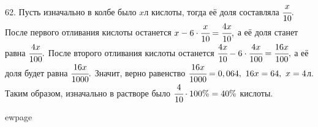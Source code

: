 62. Пусть изначально в колбе было $x$л кислоты, тогда её доля составляла $\cfrac{x}{10}.$ После первого отливания кислоты останется $x-6\cdot\cfrac{x}{10}=\cfrac{4x}{10},$ а её доля станет равна $\cfrac{4x}{100}.$ После второго отливания кислоты останется $\cfrac{4x}{10}-6\cdot\cfrac{4x}{100}=\cfrac{16x}{100},$ а её доля будет равна $\cfrac{16x}{1000}.$ Значит, верно равенство $\cfrac{16x}{1000}=0,064,\ 16x=64,\ x=4$л. Таким образом, изначально в растворе было $\cfrac{4}{10}\cdot100\%=40\%$ кислоты.

ewpage

